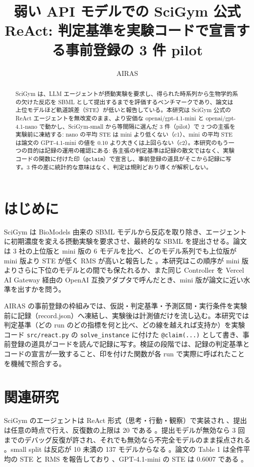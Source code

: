 \documentclass{article}
\title{弱い API モデルでの SciGym 公式 ReAct: 判定基準を実験コードで宣言する事前登録の 3 件 pilot}
\author{AIRAS}
\providecommand{\unverified}[1]{#1}
\begin{document}
\maketitle

\begin{abstract}
SciGym \citep{duan-2025-measuring} は、LLM エージェントが摂動実験を要求し、得られた時系列から生物学的系の欠けた反応を SBML として提出するまでを評価するベンチマークであり、論文は上位モデルほど軌道誤差（STE）が低いと報告している。本研究は SciGym 公式の ReAct エージェントを無改変のまま、より安価な openai/gpt-4.1-mini と openai/gpt-4.1-nano で動かし、SciGym-small から等間隔に選んだ 3 件（pilot）で 2 つの主張を実験前に凍結する: nano の平均 STE は mini より低くない（c1）、mini の平均 STE は論文の GPT-4.1-mini の値を 0.10 より大きくは上回らない（c2）。本研究のもう一つの目的は記録の運用の確認にある: 各主張の判定基準は記録の散文ではなく、実験コードの関数に付けた印（\texttt{@claim}）で宣言し、事前登録の道具がそこから記録に写す。3 件の差に統計的な意味はなく、判定は規則どおり導くが解釈しない。
\end{abstract}

\section{はじめに}
\label{sec:intro}
SciGym \citep{duan-2025-measuring} は BioModels 由来の SBML モデルから反応を取り除き、エージェントに初期濃度を変える摂動実験を要求させ、最終的な SBML を提出させる。論文は 3 社の上位版と mini 版の 6 モデルを比べ、どのモデル系列でも上位版が mini 版より STE が低く RMS が高いと報告した \cite[s1.p4]{duan-2025-measuring}。本研究はこの順序が mini 版よりさらに下位のモデルとの間でも保たれるか、また同じ Controller を Vercel AI Gateway 経由の OpenAI 互換アダプタで呼んだとき、mini 版が論文に近い水準を出すかを問う。

AIRAS の事前登録の枠組みでは、仮説・判定基準・予測区間・実行条件を実験前に記録（record.json）へ凍結し、実験後は計測値だけを流し込む。本研究では判定基準（どの run のどの指標を何と比べ、どの線を越えれば支持か）を実験コード \texttt{src/react.py} の \texttt{solve\_instance} に付けた \texttt{@claim(...)} として書き、事前登録の道具がコードを読んで記録に写す。検証の段階では、記録の判定基準とコードの宣言が一致すること、印を付けた関数が各 run で実際に呼ばれたことを機械で照合する。

\section{関連研究}
\label{sec:related}
SciGym のエージェントは ReAct 形式（思考・行動・観察）で実装され \cite[s1.p3]{duan-2025-measuring}、提出は任意の時点で行え、反復数の上限は 20 である \cite[s1.p1]{duan-2025-measuring}。提出モデルが無効なら 3 回までのデバッグ反復が許され、それでも無効なら不完全モデルのまま採点される \cite[s1.p2]{duan-2025-measuring}。small split は反応が 10 未満の 137 モデルからなる \cite[s1.p7]{duan-2025-measuring}。論文の Table 1 は全件平均の STE と RMS を報告しており \cite[s1.p6]{duan-2025-measuring}、GPT-4.1-mini の STE は \unverified{0.6007} である \cite[s1.p5]{duan-2025-measuring}。
\end{document}
